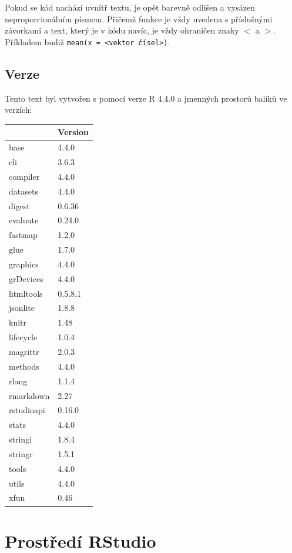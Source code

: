 \documentclass[
  letterpaper,
  DIV=11,
  numbers=noendperiod]{scrreprt}
\begin{document}
Pokud se kód nachází uvnitř textu, je opět barevně odlišen a vysázen
neproporcionálním písmem. Přičemž funkce je vždy uvedena s příslušnými
závorkami a text, který je v kódu navíc, je vždy ohraničen znaky \(<\) a
\(>\). Příkladem budiž
\texttt{mean(x\ =\ \textless{}vektor\ čísel\textgreater{})}.

\hypertarget{verze}{%
\section{Verze}\label{verze}}

Tento text byl vytvořen s pomocí verze R 4.4.0 a jmenných prostorů
balíků ve verzích:

\begin{longtable}[]{@{}ll@{}}
\toprule\noalign{}
& Version \\
\midrule\noalign{}
\endhead
\bottomrule\noalign{}
\endlastfoot
base & 4.4.0 \\
cli & 3.6.3 \\
compiler & 4.4.0 \\
datasets & 4.4.0 \\
digest & 0.6.36 \\
evaluate & 0.24.0 \\
fastmap & 1.2.0 \\
glue & 1.7.0 \\
graphics & 4.4.0 \\
grDevices & 4.4.0 \\
htmltools & 0.5.8.1 \\
jsonlite & 1.8.8 \\
knitr & 1.48 \\
lifecycle & 1.0.4 \\
magrittr & 2.0.3 \\
methods & 4.4.0 \\
rlang & 1.1.4 \\
rmarkdown & 2.27 \\
rstudioapi & 0.16.0 \\
stats & 4.4.0 \\
stringi & 1.8.4 \\
stringr & 1.5.1 \\
tools & 4.4.0 \\
utils & 4.4.0 \\
xfun & 0.46 \\
\end{longtable}


\hypertarget{prostux159eduxed-rstudio}{%
\chapter{Prostředí RStudio}\label{prostux159eduxed-rstudio}}
\end{document}
